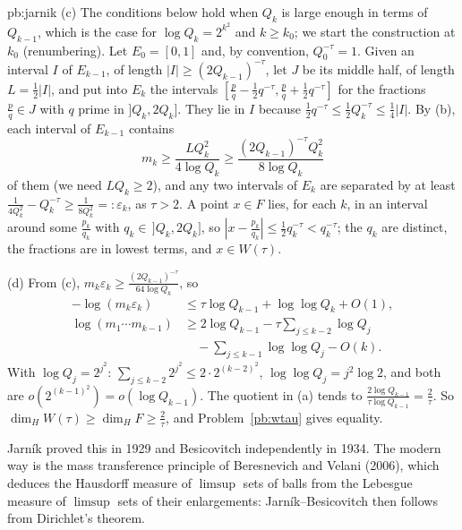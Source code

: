 \begin{solution}{pb:jarnik}
(c) The conditions below hold when $Q_k$ is large enough in terms of $Q_{k-1}$, which is the case for $\log Q_k=2^{k^2}$ and $k\ge k_0$; we start the construction at
$k_0$ (renumbering). Let $E_0=[0,1]$ and, by convention, $Q_0^{-\tau}=1$. Given an interval $I$ of $E_{k-1}$, of length $|I|\ge(2Q_{k-1})^{-\tau}$, let $J$ be its middle half, of
length $L=\frac12|I|$, and put into $E_k$ the intervals $[\frac pq-\frac12q^{-\tau},\frac pq+\frac12q^{-\tau}]$ for the fractions $\frac pq\in J$ with $q$ prime in
$]Q_k,2Q_k]$. They lie in $I$ because $\frac12q^{-\tau}\le\frac12Q_k^{-\tau}\le\frac14|I|$. By (b), each interval of $E_{k-1}$ contains
\[
m_k\ge\frac{LQ_k^2}{4\log Q_k}\ge\frac{(2Q_{k-1})^{-\tau}Q_k^2}{8\log Q_k}
\]
of them (we need $LQ_k\ge2$), and any two intervals of $E_k$ are separated by at least $\frac1{4Q_k^2}-Q_k^{-\tau}\ge\frac1{8Q_k^2}=:\varepsilon_k$, as $\tau>2$. A point $x\in F$
lies, for each $k$, in an interval around some $\frac{p_k}{q_k}$ with $q_k\in\,]Q_k,2Q_k]$, so $|x-\frac{p_k}{q_k}|\le\frac12q_k^{-\tau}<q_k^{-\tau}$; the $q_k$ are distinct, the fractions
are in lowest terms, and $x\in W(\tau)$.

(d) From (c), $m_k\varepsilon_k\ge\frac{(2Q_{k-1})^{-\tau}}{64\log Q_k}$, so
\[
\begin{aligned}
-\log(m_k\varepsilon_k)&\le\tau\log Q_{k-1}+\log\log Q_k+O(1),\\
\log(m_1\cdots m_{k-1})&\ge2\log Q_{k-1}-\tau\sum_{j\le k-2}\log Q_j\\
&\quad-\sum_{j\le k-1}\log\log Q_j-O(k).
\end{aligned}
\]
With $\log Q_j=2^{j^2}$: $\sum_{j\le k-2}2^{j^2}\le2\cdot2^{(k-2)^2}$, $\log\log Q_j=j^2\log2$, and both are $o(2^{(k-1)^2})=o(\log Q_{k-1})$. The quotient in (a) tends to
$\frac{2\log Q_{k-1}}{\tau\log Q_{k-1}}=\frac2\tau$. So $\dim_HW(\tau)\ge\dim_HF\ge\frac2\tau$, and Problem~\ref{pb:wtau} gives equality.

\leads Jarník proved this in 1929 and Besicovitch independently in 1934. The modern way is the mass transference principle of Beresnevich and Velani (2006), which
deduces the Hausdorff measure of $\limsup$ sets of balls from the Lebesgue measure of $\limsup$ sets of their enlargements: Jarník--Besicovitch then follows from
Dirichlet's theorem.
\end{solution}

